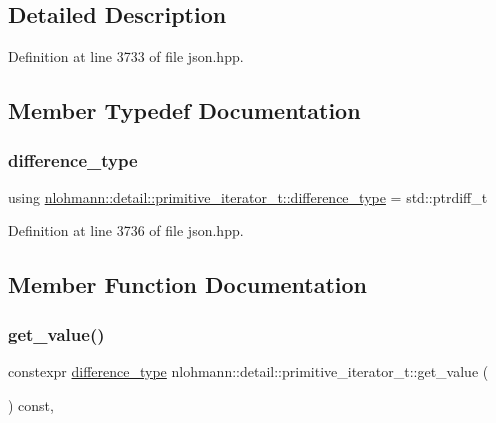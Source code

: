 \subsection{Detailed Description}


Definition at line 3733 of file json.\+hpp.



\subsection{Member Typedef Documentation}
\mbox{\label{classnlohmann_1_1detail_1_1primitive__iterator__t_af3db0d5c90de427d51645fe73a015553}} 
\subsubsection{\texorpdfstring{difference\+\_\+type}{difference\_type}}
{\footnotesize\ttfamily using \hyperlink{classnlohmann_1_1detail_1_1primitive__iterator__t_af3db0d5c90de427d51645fe73a015553}{nlohmann\+::detail\+::primitive\+\_\+iterator\+\_\+t\+::difference\+\_\+type} =  std\+::ptrdiff\+\_\+t\hspace{0.3cm}{\ttfamily [private]}}



Definition at line 3736 of file json.\+hpp.



\subsection{Member Function Documentation}
\mbox{\label{classnlohmann_1_1detail_1_1primitive__iterator__t_ae952990886ca1756229f916661a8af81}} 
\subsubsection{\texorpdfstring{get\+\_\+value()}{get\_value()}}
{\footnotesize\ttfamily constexpr \hyperlink{classnlohmann_1_1detail_1_1primitive__iterator__t_af3db0d5c90de427d51645fe73a015553}{difference\+\_\+type} nlohmann\+::detail\+::primitive\+\_\+iterator\+\_\+t\+::get\+\_\+value (\begin{DoxyParamCaption}{ }\end{DoxyParamCaption}) const\hspace{0.3cm}{\ttfamily [inline]}, {\ttfamily [noexcept]}}



